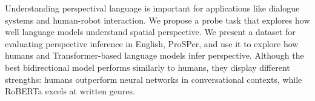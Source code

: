 Understanding perspectival language is important for applications like dialogue systems and human-robot interaction. We propose a probe task that explores how well language models understand spatial perspective. We present a dataset for evaluating perspective inference in English, ProSPer, and use it to explore how humans and Transformer-based language models infer perspective. Although the best bidirectional model performs similarly to humans, they display different strengths: humans outperform neural networks in conversational contexts, while RoBERTa excels at written genres.
